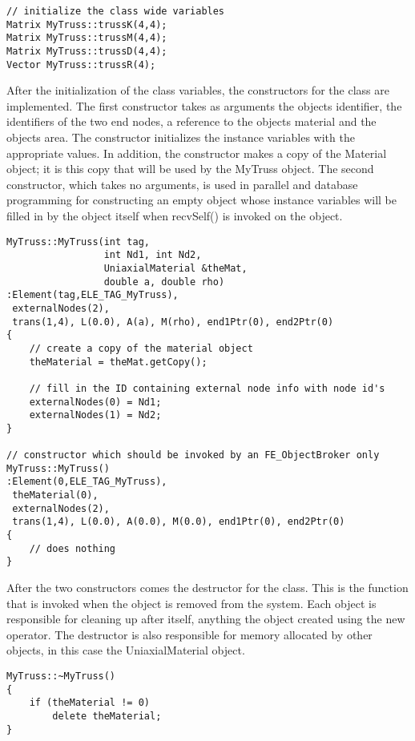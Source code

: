 \documentclass[12pt]{article}
\begin{document}
{\sf\small
\begin{verbatim}
// initialize the class wide variables
Matrix MyTruss::trussK(4,4);
Matrix MyTruss::trussM(4,4);
Matrix MyTruss::trussD(4,4);
Vector MyTruss::trussR(4);
\end{verbatim}
}

After the initialization of the class variables, the constructors for
the class are implemented. The first constructor takes as arguments
the objects identifier, the identifiers of the two end nodes, a
reference to the objects material and the objects area. The
constructor initializes the instance variables with the
appropriate values. In addition, the constructor makes a copy of the
Material object; it is this copy that will be used by the MyTruss
object. The second constructor, which takes no arguments,
is used in parallel and database programming for constructing an empty
object whose instance variables will be filled in by the object itself
when {\sf recvSelf()} is invoked on the object.

{\sf\small
\begin{verbatim}
MyTruss::MyTruss(int tag, 
                 int Nd1, int Nd2, 
                 UniaxialMaterial &theMat, 
                 double a, double rho)
:Element(tag,ELE_TAG_MyTruss),     
 externalNodes(2),
 trans(1,4), L(0.0), A(a), M(rho), end1Ptr(0), end2Ptr(0)
{	
    // create a copy of the material object
    theMaterial = theMat.getCopy();

    // fill in the ID containing external node info with node id's
    externalNodes(0) = Nd1;
    externalNodes(1) = Nd2;        
}

// constructor which should be invoked by an FE_ObjectBroker only
MyTruss::MyTruss()
:Element(0,ELE_TAG_MyTruss),     
 theMaterial(0),
 externalNodes(2),
 trans(1,4), L(0.0), A(0.0), M(0.0), end1Ptr(0), end2Ptr(0)
{
    // does nothing
}
\end{verbatim}
}


After the two constructors comes the destructor for the class. This is
the function that is invoked when the object is removed from the
system. Each object is responsible for cleaning up after itself,
anything the object created using the new operator. The
destructor is also responsible for memory allocated by other 
objects, in this case the UniaxialMaterial object.

{\sf\small
\begin{verbatim}
MyTruss::~MyTruss()
{
    if (theMaterial != 0)
        delete theMaterial;    
}
\end{verbatim}
}
\end{document}
